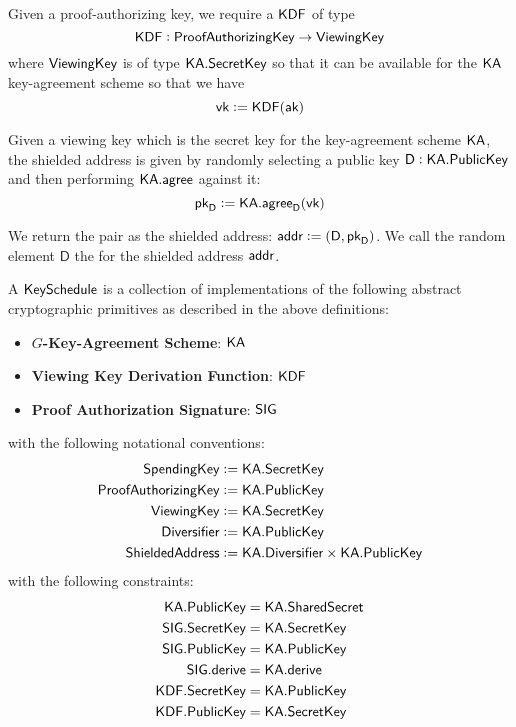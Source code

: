 \begin{definition}
    Given a proof-authorizing key, we require a ${\textsf{KDF}}$ of type
    \[{\textsf{KDF}} : {\textsf{ProofAuthorizingKey}} \to {\textsf{ViewingKey}}\]
    where ${\textsf{ViewingKey}}$ is of type ${\textsf{KA}}.{\textsf{SecretKey}}$ so that it can be available for the ${\textsf{KA}}$ key-agreement scheme so that we have
    \[{\textsf{vk}} := {\textsf{KDF}}({\textsf{ak}})\]
\end{definition}

\begin{definition}
    Given a viewing key which is the secret key for the key-agreement scheme ${\textsf{KA}}$, the shielded address is given by randomly selecting a public key $\textsf{D} : {\textsf{KA}}.{\textsf{PublicKey}}$ and then performing ${\textsf{KA}}.{\textsf{agree}}$ against it:
    \[{\textsf{pk}}_\textsf{D} := {\textsf{KA}}.{\textsf{agree}}_\textsf{D}({\textsf{vk}})\]

    We return the pair as the shielded address: ${\textsf{addr}} := (\textsf{D}, {\textsf{pk}}_\textsf{D})$. We call the random element $\textsf{D}$ the \Diversifier{} for the shielded address ${\textsf{addr}}$.
\end{definition}

\begin{definition}
    A ${\textsf{KeySchedule}}$ is a collection of implementations of the following abstract cryptographic primitives as described in the above definitions:
    \begin{itemize}
        \item \textbf{$G$-Key-Agreement Scheme}: ${\textsf{KA}}$
        \item \textbf{Viewing Key Derivation Function}: ${\textsf{KDF}}$
        \item \textbf{Proof Authorization Signature}: ${\textsf{SIG}}$
    \end{itemize}
    with the following notational conventions:
    \begin{align*}
        {\textsf{SpendingKey}}         &:= {\textsf{KA}}.{\textsf{SecretKey}} \\
        {\textsf{ProofAuthorizingKey}} &:= {\textsf{KA}}.{\textsf{PublicKey}} \\
        {\textsf{ViewingKey}}          &:= {\textsf{KA}}.{\textsf{SecretKey}} \\
        {\textsf{Diversifier}}         &:= {\textsf{KA}}.{\textsf{PublicKey}} \\
        {\textsf{ShieldedAddress}}     &:= {\textsf{KA}}.{\textsf{Diversifier}} \times {\textsf{KA}}.{\textsf{PublicKey}}
    \end{align*}
    with the following constraints:
    \begin{align*}
        {\textsf{KA}}.{\textsf{PublicKey}} &= {\textsf{KA}}.{\textsf{SharedSecret}} \\
        {\textsf{SIG}}.{\textsf{SecretKey}} &= {\textsf{KA}}.{\textsf{SecretKey}} \\
        {\textsf{SIG}}.{\textsf{PublicKey}} &= {\textsf{KA}}.{\textsf{PublicKey}} \\
        {\textsf{SIG}}.{\textsf{derive}}    &= {\textsf{KA}}.{\textsf{derive}} \\
        {\textsf{KDF}}.{\textsf{SecretKey}} &= {\textsf{KA}}.{\textsf{PublicKey}} \\
        {\textsf{KDF}}.{\textsf{PublicKey}} &= {\textsf{KA}}.{\textsf{SecretKey}}
    \end{align*}
\end{definition}

